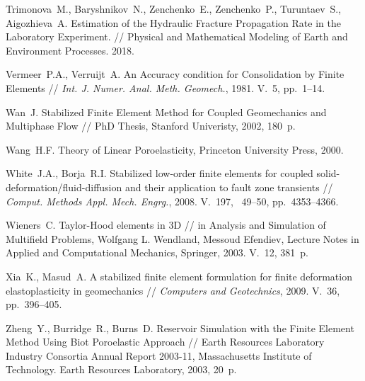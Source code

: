 \begin{thebibliography}{1000}
Trimonova~M., Baryshnikov~N., Zenchenko~E., Zenchenko~P., Turuntaev~S., Aigozhieva~A.
Estimation of the Hydraulic Fracture Propagation Rate in the Laboratory Experiment. // 
Physical and Mathematical Modeling of Earth and Environment Processes. 2018.

Vermeer~P.A., Verruijt~A.
An Accuracy condition for Consolidation by Finite Elements //
\emph{Int. J. Numer. Anal. Meth. Geomech.}, 1981. V.~5, pp.~1--14.

Wan~J. Stabilized Finite Element Method for Coupled Geomechanics and  Multiphase Flow //
PhD Thesis, Stanford Univeristy, 2002, 180~p.

Wang~H.F. Theory of Linear Poroelasticity, Princeton University Press, 2000.

White~J.A., Borja~R.I. 
Stabilized low-order finite elements for coupled solid-deformation/fluid-diffusion and their application to fault zone transients //
\emph{Comput. Methods Appl. Mech. Engrg.}, 2008.
V.~197, \No~49--50, pp.~4353--4366.

Wieners~C.
Taylor-Hood elements in 3D // in Analysis and Simulation of Multifield Problems, 
Wolfgang L. Wendland, Messoud Efendiev, Lecture Notes in Applied and Computational Mechanics, Springer, 2003.
V.~12, 381~p.

Xia~K., Masud~A.
A stabilized finite element formulation for finite deformation
elastoplasticity in geomechanics // \emph{Computers and Geotechnics}, 2009.
V.~36, pp.~396--405.

Zheng~Y., Burridge~R., Burns~D.
Reservoir Simulation with the Finite Element Method Using Biot Poroelastic Approach // 
Earth Resources Laboratory Industry Consortia Annual Report 2003-11, 
Massachusetts Institute of Technology. Earth Resources Laboratory, 2003, 20~p.

\end{thebibliography}

\endinput

